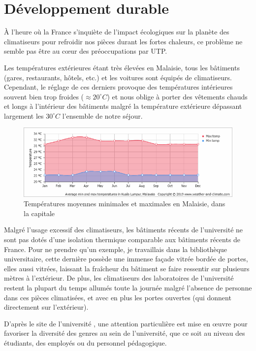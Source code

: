 \chapter{Développement durable}

À l'heure où la France s'inquiète de l'impact écologiques sur la planète des climatiseurs pour refroidir nos pièces durant les fortes chaleurs, ce problème ne semble pas être au cœur des préoccupations par UTP.

Les températures extérieures étant très élevées en Malaisie, tous les bâtiments (gares, restaurants, hôtels, etc.) et les voitures sont équipés de climatiseurs. Cependant, le réglage de ces derniers provoque des températures intérieures souvent bien trop froides ($\approx 20^{\circ}C$) et nous oblige à porter des vêtements chauds et longs à l'intérieur des bâtiments malgré la température extérieure dépassant largement les $30^{\circ}C$ l'ensemble de  notre séjour.

\begin{figure}[h]
  \includegraphics[width=1\linewidth]{content/imgs/temp.png}
  \caption{Températures moyennes minimales et maximales en Malaisie, dans la capitale}
  \label{fig:climate}
\end{figure}

Malgré l'usage excessif des climatiseurs, les bâtiments récents de l'université ne sont pas dotés d'une isolation thermique comparable aux bâtiments récents de France. Pour ne prendre qu'un exemple, je travaillais dans la bibliothèque universitaire, cette dernière possède une immense façade vitrée bordée de portes, elles aussi vitrées, laissant la fraîcheur du bâtiment se faire ressentir sur plusieurs mètres à l'extérieur. De plus, les climatiseurs des laboratoires de l'université restent la plupart du temps allumés toute la journée malgré l'absence de personne dans ces pièces climatisées, et avec en plus les portes ouvertes (qui donnent directement sur l'extérieur).

D'après le site de l'université \cite{utp_gender}, une attention particulière est mise en œuvre pour favoriser la diversité des genres au sein de l'université, que ce soit au niveau des étudiants, des employés ou du personnel pédagogique.
